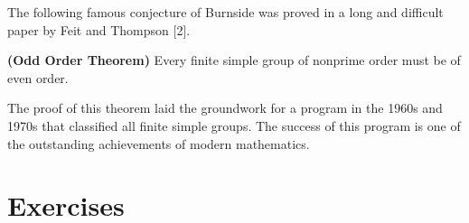  
\medskip
 
 
The following famous conjecture of Burnside was proved in a long and
difficult paper by Feit and Thompson [2].   
 
 
\begin{theorem} 
{\bf (Odd Order Theorem) }
Every finite simple group of nonprime order must be of even order. 
\end{theorem}
 
 
The proof of this theorem laid the groundwork for a program in the 
1960s and 1970s that classified all finite simple groups.
The success of this program is one of the outstanding achievements of
modern mathematics. 
 
 
 
\section*{Exercises}
\exrule
 
